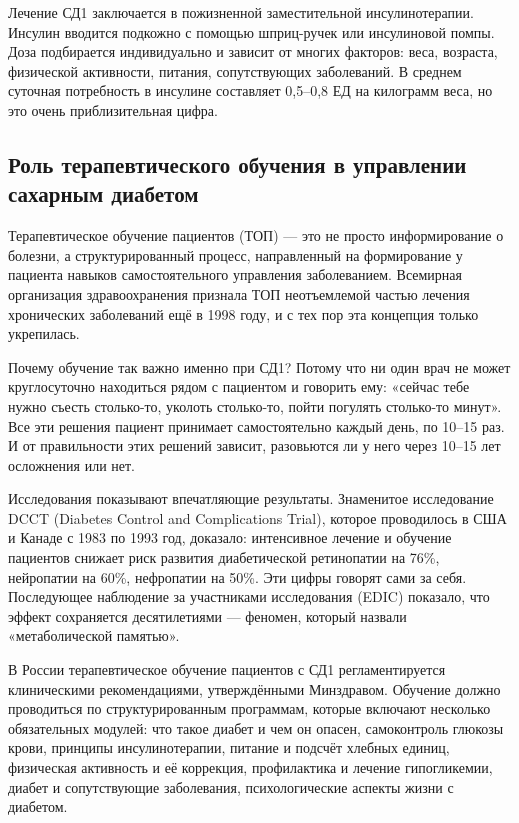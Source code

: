 \documentclass[14pt, a4paper]{extarticle}
\begin{document}
\medskip
\noindent Лечение СД1 заключается в пожизненной заместительной инсулинотерапии. Инсулин вводится подкожно с помощью шприц-ручек или инсулиновой помпы. Доза подбирается индивидуально и зависит от многих факторов: веса, возраста, физической активности, питания, сопутствующих заболеваний. В среднем суточная потребность в инсулине составляет 0,5–0,8 ЕД на килограмм веса, но это очень приблизительная цифра.

\subsection{Роль терапевтического обучения в управлении сахарным диабетом}

\noindent Терапевтическое обучение пациентов (ТОП) — это не просто информирование о болезни, а структурированный процесс, направленный на формирование у пациента навыков самостоятельного управления заболеванием. Всемирная организация здравоохранения признала ТОП неотъемлемой частью лечения хронических заболеваний ещё в 1998 году, и с тех пор эта концепция только укрепилась.

\medskip
\noindent Почему обучение так важно именно при СД1? Потому что ни один врач не может круглосуточно находиться рядом с пациентом и говорить ему: «сейчас тебе нужно съесть столько-то, уколоть столько-то, пойти погулять столько-то минут». Все эти решения пациент принимает самостоятельно каждый день, по 10–15 раз. И от правильности этих решений зависит, разовьются ли у него через 10–15 лет осложнения или нет.

\vskip 5cm
\noindent Исследования показывают впечатляющие результаты. Знаменитое исследование DCCT (Diabetes Control and Complications Trial), которое проводилось в США и Канаде с 1983 по 1993 год, доказало: интенсивное лечение и обучение пациентов снижает риск развития диабетической ретинопатии на 76\%, нейропатии на 60\%, нефропатии на 50\%. Эти цифры говорят сами за себя. Последующее наблюдение за участниками исследования (EDIC) показало, что эффект сохраняется десятилетиями — феномен, который назвали «метаболической памятью».

\medskip
\noindent В России терапевтическое обучение пациентов с СД1 регламентируется клиническими рекомендациями, утверждёнными Минздравом. Обучение должно проводиться по структурированным программам, которые включают несколько обязательных модулей: что такое диабет и чем он опасен, самоконтроль глюкозы крови, принципы инсулинотерапии, питание и подсчёт хлебных единиц, физическая активность и её коррекция, профилактика и лечение гипогликемии, диабет и сопутствующие заболевания, психологические аспекты жизни с диабетом.
\end{document}

